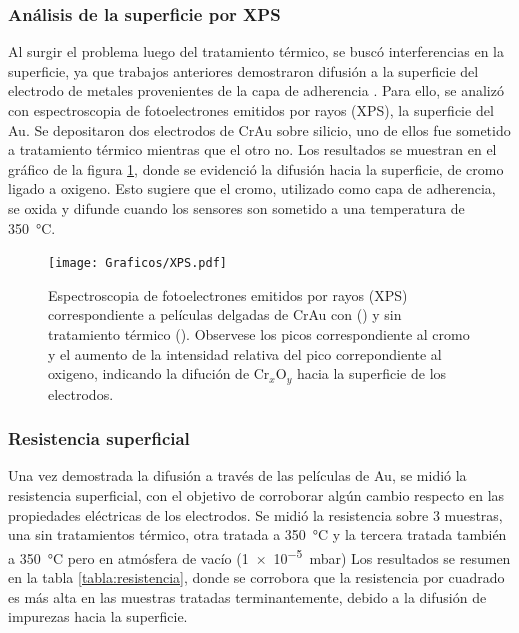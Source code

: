{		\subsubsection{Análisis de la superficie por XPS}

			Al surgir el problema luego del tratamiento térmico, se buscó interferencias en la superficie, ya que trabajos anteriores demostraron difusión a la superficie del electrodo de metales provenientes de la capa de adherencia \cite{Alonso1990,Moody2003}. Para ello, se analizó con espectroscopia de fotoelectrones emitidos por rayos (XPS), la superficie del Au. Se depositaron dos electrodos de Cr\textbar Au sobre silicio, uno de ellos fue sometido a tratamiento térmico mientras que el otro no. Los resultados se muestran en el gráfico de la figura \ref{fig:XPS}, donde se evidenció la difusión hacia la superficie, de cromo ligado a oxigeno. Esto sugiere que el cromo, utilizado como capa de adherencia, se oxida y difunde cuando los sensores son sometido a una temperatura de \SI{350}{\celsius}.

				\begin{figure}[ht!]
		 	       	\texttt{[image: Graficos/XPS.pdf]}
		        	\caption[XPS de peliculas delgadas de Cr\textbar Au]{Espectroscopia de fotoelectrones emitidos por rayos (XPS) correspondiente a películas delgadas de Cr\textbar Au con (\usebox{\rojo}) y sin tratamiento térmico  (\usebox{\marron}). Observese los picos correspondiente al cromo y el aumento de la intensidad relativa del pico correpondiente al oxigeno, indicando la difución de Cr$_x$O$_y$ hacia la superficie de los electrodos.}
		         	\label{fig:XPS}
		     		\end{figure}
		
		\subsubsection{Resistencia superficial}

			Una vez demostrada la difusión a través de las películas de Au, se midió la resistencia superficial, con el objetivo de corroborar algún cambio respecto en las propiedades eléctricas de los electrodos. Se midió la resistencia sobre 3 muestras, una sin tratamientos térmico, otra tratada a \SI{350}{\celsius} y la tercera tratada también a \SI{350}{\celsius} pero en atmósfera de vacío (\SI{1e-5}{\milli\bar}) Los resultados se resumen en la tabla \ref{tabla:resistencia}, donde se corrobora que la resistencia por cuadrado es más alta en las muestras tratadas terminantemente, debido a la difusión de impurezas hacia la superficie. 

}
